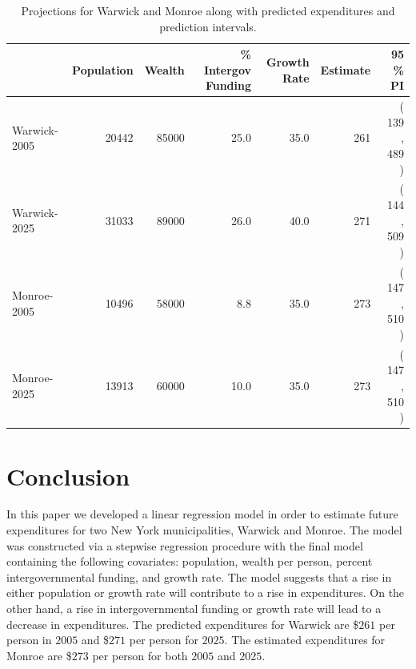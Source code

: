 \documentclass{article}\usepackage[]{graphicx}\usepackage[]{color}
\begin{document}
\begin{table}[ht]
\centering
\begin{tabular}{|l|rrrrrr|}
  \hline
 & Population & Wealth & \% Intergov Funding & Growth Rate & Estimate & 95 \% PI \\ 
  \hline
Warwick-2005 & 20442 & 85000 & 25.0 & 35.0 & 261 & ( 139 , 489 ) \\ 
  Warwick-2025  & 31033 & 89000 & 26.0 & 40.0 & 271 & ( 144 , 509 ) \\ 
  Monroe-2005 & 10496 & 58000 & 8.8 & 35.0 & 273 & ( 147 , 510 ) \\ 
  Monroe-2025 & 13913 & 60000 & 10.0 & 35.0 & 273 & ( 147 , 510 ) \\ 
   \hline
\end{tabular}
\caption{Projections for Warwick and Monroe along with predicted expenditures and prediction intervals.} 
\label{tbl:pred}
\end{table}




\section{Conclusion} \label{conclusion}

In this paper we developed a linear regression model in order to estimate future expenditures for two New York municipalities, Warwick and Monroe. The model was constructed via a stepwise regression procedure with the final model containing the following covariates: population, wealth per person, percent intergovernmental funding, and growth rate. The model suggests that a rise in either population or growth rate will contribute to a rise in expenditures. On the other hand, a rise in intergovernmental funding or growth rate will lead to a decrease in expenditures. The predicted expenditures for Warwick are \$$261$ per person in $2005$ and \$$271$ per person for $2025$. The estimated expenditures for Monroe are \$$273$ per person for both $2005$ and $2025$.
\end{document}
